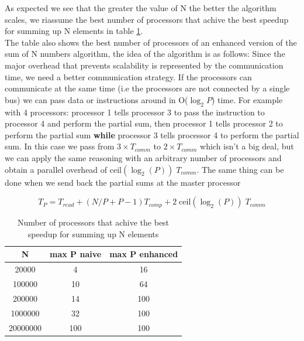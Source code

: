 \documentclass[a4paper]{article}
\begin{document}
As expected we see that the greater the value of N the better the algorithm scales, we riassume the best number of processors that achive the best speedup for summing up N elements in table \ref{tab:speedup_sum}.\\
The table also shows the best number of processors of an enhanced version of the sum of N numbers algorithm, the idea of the algorithm is as follows:
Since the major overhead that prevents scalability is represented by the communication time, we need a better communication strategy. If the processors can communicate at the same time (i.e the processors are not connected by a single bus) we can pass data or instructions around in O($\log_2P$) time. For example with 4 processors: processor 1 tells processor 3 to pass the instruction to processor 4 and perform the partial sum, then processor 1 tells processor 2 to perform the partial sum \textbf{while} processor 3 tells processor 4 to perform the partial sum. In this case we pass from $3\times T_{comm}$ to $2\times T_{comm}$ which isn't a big deal, but we can apply the same reasoning with an arbitrary number of processors and obtain a parallel overhead of $\mathrm{ceil}(\log_2(P))\;T_{comm}$. The same thing can be done when we send back the partial sums at the master processor

\begin{equation}
    T_P = T_{read} + (N/P + P-1)T_{comp} + 2\;\mathrm{ceil}(\log_2(P))\;T_{comm}
\end{equation}

\begin{table}[h]
    \centering
    \begin{tabular}{ccc}
        N & max P naive & max P enhanced\\
        \hline\hline
        20000& 4 &16\\
        100000& 10 &64\\
        200000& 14 &100\\
        1000000& 32&100\\
        20000000& 100&100\\
        \hline
    \end{tabular}
    \caption{Number of processors that achive the best speedup for summing up N elements}
    \label{tab:speedup_sum}
\end{table}
\end{document}
